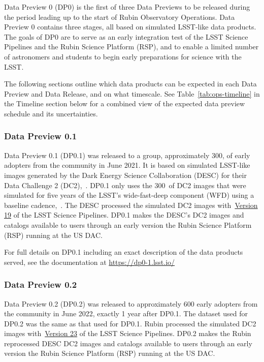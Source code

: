 Data Preview 0 (DP0) is the first of three Data Previews to be released during the period leading up to the start of Rubin Observatory Operations. 
Data Preview 0 contains three stages, all based on simulated LSST-like data products. 
The goals of DP0 are to serve as an early integration test of the LSST Science Pipelines and the Rubin Science Platform (RSP), and to enable a limited number of astronomers and students to begin early preparations for science with the LSST.

The following sections outline which data products can be expected in each Data Preview and Data Release, and on what timescale.
See Table~\ref{tab:ops-timeline} in the Timeline section below for a combined view of the expected data preview schedule and its uncertainties.

\subsubsection{Data Preview 0.1}
\label{sec:dp01}

Data Preview 0.1 (DP0.1) was released to a group, approximately 300,  of early adopters from the community in June 2021. 
It is based on simulated LSST-like images generated by the Dark Energy Science Collaboration (DESC) for their Data Challenge 2 (DC2),~\citep{2021ApJS..253...31L}.
DP0.1 only uses the 300~\sqdeg of DC2 images that were simulated for five years of the LSST’s wide-fast-deep component (WFD) using a baseline cadence,~.
The DESC processed the simulated DC2 images with~\href{https://pipelines.lsst.io/v/v19_0_0/index.html}{Version 19} of the LSST Science Pipelines.
DP0.1 makes the DESC’s DC2 images and catalogs available to users through an early version the Rubin Science Platform (RSP) running at the US DAC. 

For full details on DP0.1 including an exact description of the data products served, see the documentation at \url{https://dp0-1.lsst.io/}

\subsubsection{Data Preview 0.2}
\label{sec:dp02}

Data Preview 0.2 (DP0.2) was released to approximately 600 early adopters from the community in June 2022, exactly 1 year after DP0.1. 
The dataset used for DP0.2 was the same as that used for DP0.1.
Rubin processed the simulated DC2 images with~\href{https://pipelines.lsst.io/v/v23_0_0/index.html}{Version 23} of the LSST Science Pipelines.
DP0.2 makes the Rubin reprocessed DESC DC2 images and catalogs available to users through an early version the Rubin Science Platform (RSP) running at the US DAC. 

